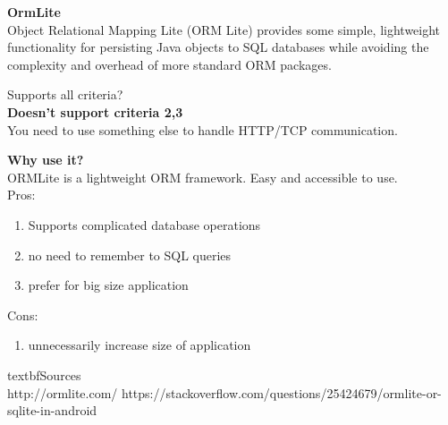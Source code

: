 		\textbf{OrmLite} \\
		Object Relational Mapping Lite (ORM Lite) provides some simple, lightweight functionality for persisting Java objects to SQL databases while avoiding the complexity and overhead of more standard ORM packages.

		Supports all criteria?\\
		\textbf{Doesn't support criteria 2,3}\\
		You need to use something else to handle HTTP/TCP communication.
		
		\textbf{Why use it?} \\
		ORMLite is a lightweight ORM framework. Easy and accessible to use.\\
		
		Pros:
		\begin{enumerate}
		\item Supports complicated database operations
		\item no need to remember to SQL queries
		\item prefer for big size application
		\end{enumerate}
		Cons:
		\begin{enumerate}
		\item unnecessarily increase size of application
		\end{enumerate}
	
	textbf{Sources}\\
	http://ormlite.com/
	https://stackoverflow.com/questions/25424679/ormlite-or-sqlite-in-android